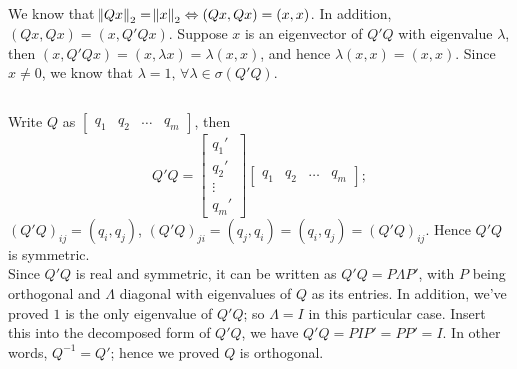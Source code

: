\documentclass[11pt]{article}
\begin{document}
\section{}
\subsection{}
We know that $\norm{Qx}_2=\norm{x}_2\Leftrightarrow(Qx,Qx)=(x,x)$. In addition, $(Qx, Qx)=(x,Q'Qx)$. Suppose $x$ is an eigenvector of $Q'Q$ with eigenvalue $\lambda$, then $(x,Q'Qx)=(x,\lambda x)=\lambda(x,x)$, and hence $\lambda(x,x)=(x,x)$. Since $x\neq0$, we know that $\lambda=1,\,\forall\lambda\in\sigma(Q'Q)$.
\subsection{}
Write $Q$ as $\begin{bmatrix} q_1 & q_2 & \dots &q_m\end{bmatrix}$, then $$Q'Q=\begin{bmatrix} q_1'\\q_2'\\\vdots\\q_m'\end{bmatrix}\begin{bmatrix} q_1&q_2&\dots&q_m\end{bmatrix}; $$ $(Q'Q)_{ij}=(q_i,q_j)$, $(Q'Q)_{ji}=(q_j,q_i)=(q_i,q_j)=(Q'Q)_{ij}$. Hence $Q'Q$ is symmetric.\\[0.5cm]
Since $Q'Q$ is real and symmetric, it can be written as $Q'Q=P\Lambda P'$, with $P$ being orthogonal and $\Lambda$ diagonal with eigenvalues of $Q$ as its entries. In addition, we've proved $1$ is the only eigenvalue of $Q'Q$; so $\Lambda=I$ in this particular case. Insert this into the decomposed form of $Q'Q$, we have $Q'Q=PIP'=PP'=I$. In other words, $Q^{-1}=Q'$; hence we proved $Q$ is orthogonal.
\end{document}
